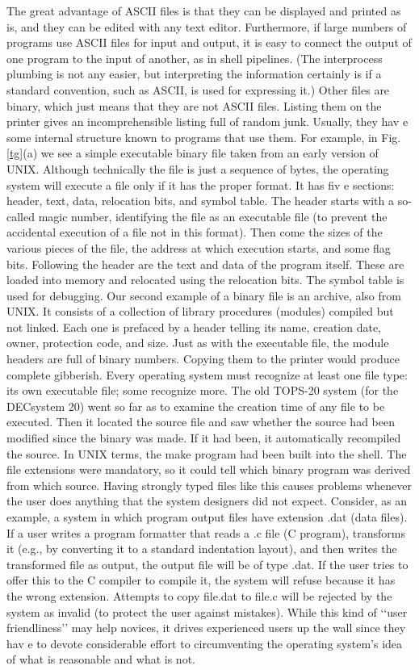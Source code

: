 The great advantage of ASCII files is that they can be displayed and printed as
is, and they can be edited with any text editor. Furthermore, if large numbers of
programs use ASCII files for input and output, it is easy to connect the output of
one program to the input of another, as in shell pipelines. (The interprocess
plumbing is not any easier, but interpreting the information certainly is if a standard
convention, such as ASCII, is used for expressing it.)
Other files are binary, which just means that they are not ASCII files. Listing
them on the printer gives an incomprehensible listing full of random junk. Usually,
they hav e some internal structure known to programs that use them.
For example, in Fig. \ref{tg}(a) we see a simple executable binary file taken from
an early version of UNIX. Although technically the file is just a sequence of bytes,
the operating system will execute a file only if it has the proper format. It has fiv e
sections: header, text, data, relocation bits, and symbol table. The header starts
with a so-called magic number, identifying the file as an executable file (to prevent
the accidental execution of a file not in this format). Then come the sizes of
the various pieces of the file, the address at which execution starts, and some flag
bits. Following the header are the text and data of the program itself. These are
loaded into memory and relocated using the relocation bits. The symbol table is
used for debugging.
Our second example of a binary file is an archive, also from UNIX. It consists
of a collection of library procedures (modules) compiled but not linked. Each one
is prefaced by a header telling its name, creation date, owner, protection code, and
size. Just as with the executable file, the module headers are full of binary numbers.
Copying them to the printer would produce complete gibberish.
Every operating system must recognize at least one file type: its own executable
file; some recognize more. The old TOPS-20 system (for the DECsystem 20)
went so far as to examine the creation time of any file to be executed. Then it located
the source file and saw whether the source had been modified since the binary
was made. If it had been, it automatically recompiled the source. In UNIX terms,
the make program had been built into the shell. The file extensions were mandatory,
so it could tell which binary program was derived from which source.
Having strongly typed files like this causes problems whenever the user does
anything that the system designers did not expect. Consider, as an example, a system
in which program output files have extension .dat (data files). If a user writes
a program formatter that reads a .c file (C program), transforms it (e.g., by converting
it to a standard indentation layout), and then writes the transformed file as output,
the output file will be of type .dat. If the user tries to offer this to the C compiler
to compile it, the system will refuse because it has the wrong extension. Attempts
to copy file.dat to file.c will be rejected by the system as invalid (to protect
the user against mistakes).
While this kind of ‘‘user friendliness’’ may help novices, it drives experienced
users up the wall since they hav e to devote considerable effort to circumventing the
operating system’s idea of what is reasonable and what is not.

